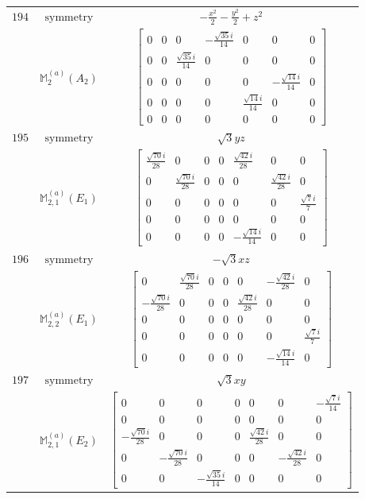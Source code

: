 \documentclass[fleqn,8pt,landscape]{jsarticle}
\begin{document}
\begin{longtable}{ccc}
$ 194 $ & $ \text{symmetry} $ & $ - \frac{x^{2}}{2} - \frac{y^{2}}{2} + z^{2} $ \\
$  $ & $ \mathbb{M}_{2}^{(a)}(A_{2}) $ & $ \begin{bmatrix} 0 & 0 & 0 & - \frac{\sqrt{35} i}{14} & 0 & 0 & 0 \\ 0 & 0 & \frac{\sqrt{35} i}{14} & 0 & 0 & 0 & 0 \\ 0 & 0 & 0 & 0 & 0 & - \frac{\sqrt{14} i}{14} & 0 \\ 0 & 0 & 0 & 0 & \frac{\sqrt{14} i}{14} & 0 & 0 \\ 0 & 0 & 0 & 0 & 0 & 0 & 0 \end{bmatrix} $ \\ \hline
$ 195 $ & $ \text{symmetry} $ & $ \sqrt{3} y z $ \\
$  $ & $ \mathbb{M}_{2,1}^{(a)}(E_{1}) $ & $ \begin{bmatrix} \frac{\sqrt{70} i}{28} & 0 & 0 & 0 & \frac{\sqrt{42} i}{28} & 0 & 0 \\ 0 & \frac{\sqrt{70} i}{28} & 0 & 0 & 0 & \frac{\sqrt{42} i}{28} & 0 \\ 0 & 0 & 0 & 0 & 0 & 0 & \frac{\sqrt{7} i}{7} \\ 0 & 0 & 0 & 0 & 0 & 0 & 0 \\ 0 & 0 & 0 & 0 & - \frac{\sqrt{14} i}{14} & 0 & 0 \end{bmatrix} $ \\ \hline
$ 196 $ & $ \text{symmetry} $ & $ - \sqrt{3} x z $ \\
$  $ & $ \mathbb{M}_{2,2}^{(a)}(E_{1}) $ & $ \begin{bmatrix} 0 & \frac{\sqrt{70} i}{28} & 0 & 0 & 0 & - \frac{\sqrt{42} i}{28} & 0 \\ - \frac{\sqrt{70} i}{28} & 0 & 0 & 0 & \frac{\sqrt{42} i}{28} & 0 & 0 \\ 0 & 0 & 0 & 0 & 0 & 0 & 0 \\ 0 & 0 & 0 & 0 & 0 & 0 & \frac{\sqrt{7} i}{7} \\ 0 & 0 & 0 & 0 & 0 & - \frac{\sqrt{14} i}{14} & 0 \end{bmatrix} $ \\ \hline
$ 197 $ & $ \text{symmetry} $ & $ \sqrt{3} x y $ \\
$  $ & $ \mathbb{M}_{2,1}^{(a)}(E_{2}) $ & $ \begin{bmatrix} 0 & 0 & 0 & 0 & 0 & 0 & - \frac{\sqrt{7} i}{14} \\ 0 & 0 & 0 & 0 & 0 & 0 & 0 \\ - \frac{\sqrt{70} i}{28} & 0 & 0 & 0 & \frac{\sqrt{42} i}{28} & 0 & 0 \\ 0 & - \frac{\sqrt{70} i}{28} & 0 & 0 & 0 & - \frac{\sqrt{42} i}{28} & 0 \\ 0 & 0 & - \frac{\sqrt{35} i}{14} & 0 & 0 & 0 & 0 \end{bmatrix} $ \\ \hline

\end{longtable}
\end{document}
